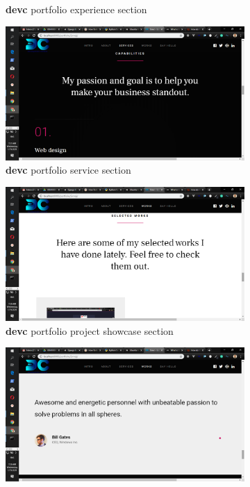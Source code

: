 \begin{itemize}
\begin{figure}[!htbp]
\begin{subfigure}[b]{0.45\textwidth}
			\caption{\textbf{devc} portfolio experience section}
		\end{subfigure}
		\hfill
		\begin{subfigure}[b]{0.45\textwidth}
			\centering
			\includegraphics[width=\linewidth]{./devcportservices}
			\caption{\textbf{devc} portfolio service section}
		\end{subfigure}
		\medskip
		\begin{subfigure}[b]{0.45\textwidth}
			\centering
			\includegraphics[width=\linewidth]{./devcportproject}
			\caption{\textbf{devc} portfolio project showcase section}
		\end{subfigure}
		\hfill
		\begin{subfigure}[b]{0.45\textwidth}
			\centering
			\includegraphics[width=\linewidth]{./devcportrecommend}

\end{subfigure}
\end{figure}
\end{itemize}
